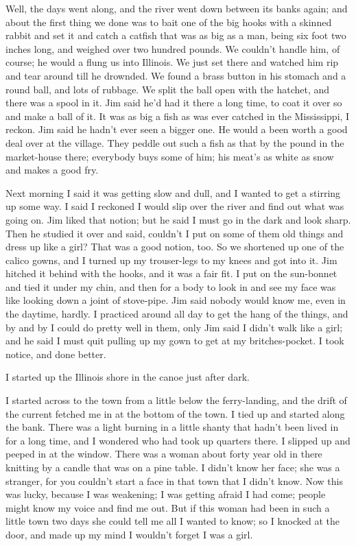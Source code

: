 Well, the days went along, and the river went down between its banks
again; and about the first thing we done was to bait one of the big hooks
with a skinned rabbit and set it and catch a catfish that was as big as a
man, being six foot two inches long, and weighed over two hundred pounds.
We couldn't handle him, of course; he would a flung us into Illinois.  We
just set there and watched him rip and tear around till he drownded.  We
found a brass button in his stomach and a round ball, and lots of
rubbage.  We split the ball open with the hatchet, and there was a spool
in it.  Jim said he'd had it there a long time, to coat it over so and
make a ball of it.  It was as big a fish as was ever catched in the
Mississippi, I reckon.  Jim said he hadn't ever seen a bigger one.  He
would a been worth a good deal over at the village.  They peddle out such
a fish as that by the pound in the market-house there; everybody buys
some of him; his meat's as white as snow and makes a good fry.

Next morning I said it was getting slow and dull, and I wanted to get a
stirring up some way.  I said I reckoned I would slip over the river and
find out what was going on.  Jim liked that notion; but he said I must go
in the dark and look sharp.  Then he studied it over and said, couldn't I
put on some of them old things and dress up like a girl?  That was a good
notion, too.  So we shortened up one of the calico gowns, and I turned up
my trouser-legs to my knees and got into it.  Jim hitched it behind with
the hooks, and it was a fair fit.  I put on the sun-bonnet and tied it
under my chin, and then for a body to look in and see my face was like
looking down a joint of stove-pipe.  Jim said nobody would know me, even
in the daytime, hardly.  I practiced around all day to get the hang of
the things, and by and by I could do pretty well in them, only Jim said I
didn't walk like a girl; and he said I must quit pulling up my gown to
get at my britches-pocket.  I took notice, and done better.

I started up the Illinois shore in the canoe just after dark.

I started across to the town from a little below the ferry-landing, and
the drift of the current fetched me in at the bottom of the town.  I tied
up and started along the bank.  There was a light burning in a little
shanty that hadn't been lived in for a long time, and I wondered who had
took up quarters there.  I slipped up and peeped in at the window.  There
was a woman about forty year old in there knitting by a candle that was
on a pine table.  I didn't know her face; she was a stranger, for you
couldn't start a face in that town that I didn't know.  Now this was
lucky, because I was weakening; I was getting afraid I had come; people
might know my voice and find me out.  But if this woman had been in such
a little town two days she could tell me all I wanted to know; so I
knocked at the door, and made up my mind I wouldn't forget I was a girl.




